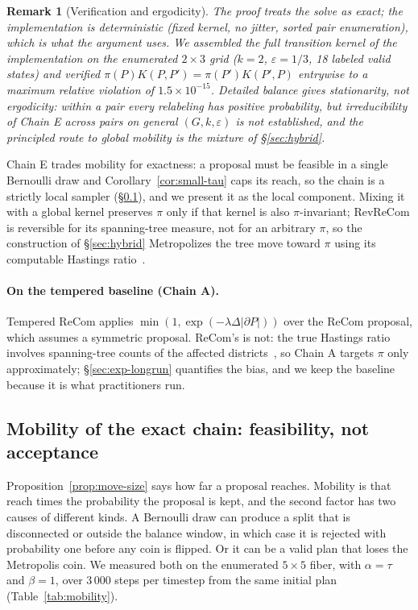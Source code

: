 \documentclass[11pt]{article}
\newtheorem{remark}{Remark}[section]
\begin{document}
\begin{remark}[Verification and ergodicity]\label{rem:qpmh-scope}
The proof treats the solve as exact; the implementation is
deterministic (fixed kernel, no jitter, sorted pair enumeration),
which is what the argument uses. We assembled the full transition
kernel of the implementation on the enumerated $2 \times 3$ grid
($k = 2$, $\varepsilon = 1/3$, 18 labeled valid states) and verified
$\pi(P)K(P,P') = \pi(P')K(P',P)$ entrywise to a maximum relative
violation of $1.5 \times 10^{-15}$. Detailed balance gives
stationarity, not ergodicity: within a pair every relabeling has
positive probability, but irreducibility of Chain E across pairs on
general $(G, k, \varepsilon)$ is not established, and the principled
route to global mobility is the mixture of \S\ref{sec:hybrid}.
\end{remark}

Chain E trades mobility for exactness: a proposal must be feasible in
a single Bernoulli draw and Corollary~\ref{cor:small-tau} caps its
reach, so the chain is a strictly local sampler
(\S\ref{sec:mobility}), and we present it as the local component.
Mixing it with a global kernel preserves $\pi$ only if that kernel is
also $\pi$-invariant; RevReCom is reversible for its spanning-tree
measure, not for an arbitrary $\pi$, so the construction of
\S\ref{sec:hybrid} Metropolizes the tree move toward $\pi$ using its
computable Hastings ratio~\cite{cannon2022spanning,autry2023metropolized}.

\paragraph{On the tempered baseline (Chain A).} Tempered ReCom applies
$\min(1, \exp(-\lambda \Delta|\partial P|))$ over the ReCom proposal,
which assumes a symmetric proposal. ReCom's is not: the true Hastings
ratio involves spanning-tree counts of the affected
districts~\cite{autry2023metropolized,cannon2022spanning}, so Chain A
targets $\pi$ only approximately; \S\ref{sec:exp-longrun} quantifies
the bias, and we keep the baseline because it is what practitioners
run.

\subsection{Mobility of the exact chain: feasibility, not acceptance}\label{sec:mobility}

Proposition~\ref{prop:move-size} says how far a proposal reaches.
Mobility is that reach times the probability the proposal is kept,
and the second factor has two causes of different kinds. A Bernoulli
draw can produce a split that is disconnected or outside the balance
window, in which case it is rejected with probability one before any
coin is flipped. Or it can be a valid plan that loses the Metropolis
coin. We measured both on the enumerated $5 \times 5$ fiber, with
$\alpha = \tau$ and $\beta = 1$, over 3\,000 steps per timestep from
the same initial plan (Table~\ref{tab:mobility}).
\end{document}
